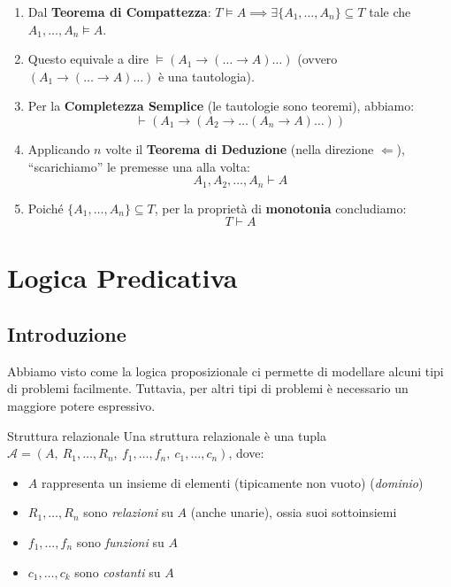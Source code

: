 \documentclass[a4paper,11pt]{report}
\begin{document}
\begin{enumerate}
    \item Dal \textbf{Teorema di Compattezza}: \( T \vDash A \implies \exists \{A_1, \dots, A_n\} \subseteq T \) tale che \( A_1, \dots, A_n \vDash A \).
\item Questo equivale a dire \( \vDash (A_1 \to (\dots \to A)\dots) \) (ovvero \(  (A_1 \to (\dots \to A)\dots) \) è una tautologia).
    \item Per la \textbf{Completezza Semplice} (le tautologie sono teoremi), abbiamo:
    \[ \vdash (A_1 \to (A_2 \to \dots (A_n \to A)\dots)) \]
    \item Applicando \( n \) volte il \textbf{Teorema di Deduzione} (nella direzione \( \Longleftarrow \)), ``scarichiamo'' le premesse una alla volta:
    \[ A_1, A_2, \dots, A_n \vdash A \]
\item Poiché \( \{A_1, \dots, A_n\} \subseteq T \), per la proprietà di \textbf{monotonia} concludiamo:
    \[ T \vdash A \]
\end{enumerate}





\chapter{Logica Predicativa}

\section{Introduzione}

Abbiamo visto come la logica proposizionale ci permette di modellare alcuni tipi di problemi facilmente. Tuttavia, per altri tipi di problemi è necessario un maggiore potere espressivo.

\begin{defframe}{Struttura relazionale}{}
Una struttura relazionale è una tupla \( \mathcal{A} = (A, \ R_1, \dots, R_n, \ f_1, \dots, f_n, \ c_1, \dots, c_n) \), dove:
\begin{itemize}
    \item \( A \) rappresenta un insieme di elementi (tipicamente non vuoto) (\textit{dominio})
    \item \(R_1, \dots, R_n \) sono \textit{relazioni} su \( A \) (anche unarie), ossia suoi sottoinsiemi 
    \item \( f_1, \dots, f_n \) sono \textit{funzioni} su \( A \)
    \item \( c_1, \dots, c_k \) sono \textit{costanti} su \( A \)
\end{itemize}
\end{defframe}
\end{document}

